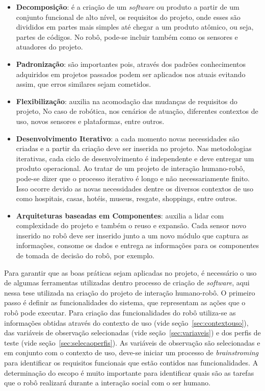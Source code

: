\begin{itemize}
    \item \textbf{Decomposição}: é a criação de um \emph{software} ou produto a partir de um conjunto funcional de alto nível, os requisitos do projeto, onde esses são divididos em partes mais simples até chegar a um produto atômico, ou seja, partes de códigos. No robô, pode-se incluir também como os sensores e atuadores do projeto.
    \item \textbf{Padronização}: são importantes pois, através dos padrões conhecimentos adquiridos em projetos passados podem ser aplicados nos atuais evitando assim, que erros similares sejam cometidos.
    \item \textbf{Flexibilização}: auxilia na acomodação das mudanças de requisitos do projeto, No caso de robótica, nos cenários de atuação, diferentes contextos de uso, novos sensores e plataformas, entre outros.
    \item \textbf{Desenvolvimento Iterativo}: a cada momento novas necessidades são criadas e a partir da criação deve ser inserida no projeto. Nas metodologias iterativas, cada ciclo de desenvolvimento é independente e deve entregar um produto operacional. Ao tratar de um projeto de interação humano-robô, pode-se dizer que o processo iterativo é longo e não necessariamente finito. Isso ocorre devido as novas necessidades dentre os diversos contextos de uso como hospitais, casas, hotéis, museus, resgate, shoppings, entre outros.
    \item \textbf{Arquiteturas baseadas em Componentes}: auxilia a lidar com complexidade do projeto e também o reuso e expansão. Cada sensor novo inserido no robô deve ser inserido junto a um novo módulo que captura as informações, consome os dados e entrega as informações para os componentes de tomada de decisão do robô, por exemplo.
\end{itemize}

Para garantir que as boas práticas sejam aplicadas no projeto, é necessário o uso de algumas ferramentas utilizadas dentro processo de criação de \emph{software}, aqui nessa tese utilizada na criação do projeto de interação humano-robô. O primeiro passo é definir as funcionalidades do sistema, que representam as ações que o robô pode executar. Para criação das funcionalidades do robô utiliza-se as informações obtidas através do contexto de uso (vide seção~\ref{sec:contextouso}), das variáveis de observação selecionadas (vide seção~\ref{sec:variaveis}) e dos perfis de teste (vide seção~\ref{sec:selecaoperfis}). As variáveis de observação são selecionadas e em conjunto com o contexto de uso, deve-se iniciar um processo de \textit{brainstroming} para identificar os requisitos funcionais que estão contidos nas funcionalidades. A determinação do escopo é muito importante para identificar quais são as tarefas que o robô realizará durante a interação social com o ser humano. 

